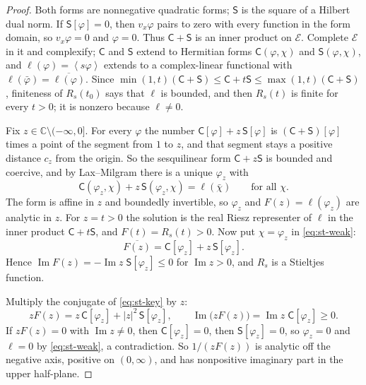 \documentclass[11pt]{article}
\newcommand{\av}[1]{\left\langle #1\right\rangle}
\newcommand{\Imag}{\operatorname{Im}}
\theoremstyle{definition}
\theoremstyle{remark}
\numberwithin{equation}{section}
\begin{document}
\begin{proof}
Both forms are nonnegative quadratic forms; $\mathsf S$ is the square of a
Hilbert dual norm. If $\mathsf S[\varphi]=0$, then $v_x\varphi$ pairs to
zero with every function in the form domain, so $v_x\varphi=0$ and
$\varphi=0$. Thus $\mathsf C+\mathsf S$ is an inner product on $\mathcal E$.
Complete $\mathcal E$ in it and complexify; $\mathsf C$ and $\mathsf S$
extend to Hermitian forms $\mathsf C(\varphi,\chi)$ and
$\mathsf S(\varphi,\chi)$, and $\ell(\varphi)=\av{s\varphi}$ extends to a
complex-linear functional with $\ell(\bar\varphi)=\overline{\ell(\varphi)}$.
Since $\min(1,t)(\mathsf C+\mathsf S)\leq\mathsf C+t\mathsf S
\leq\max(1,t)(\mathsf C+\mathsf S)$, finiteness of $R_s(t_0)$ says that
$\ell$ is bounded, and then $R_s(t)$ is finite for every $t>0$; it is
nonzero because $\ell\ne0$.

Fix $z\in\mathbb C\setminus(-\infty,0]$. For every $\varphi$ the number
$\mathsf C[\varphi]+z\,\mathsf S[\varphi]$ is
$(\mathsf C+\mathsf S)[\varphi]$ times a point of the segment from $1$ to
$z$, and that segment stays a positive distance $c_z$ from the origin. So
the sesquilinear form $\mathsf C+z\mathsf S$ is bounded and coercive, and
by Lax--Milgram there is a unique $\varphi_z$ with
\begin{equation}
 \mathsf C(\varphi_z,\chi)+z\,\mathsf S(\varphi_z,\chi)=\ell(\bar\chi)
 \qquad\text{for all }\chi .
 \label{eq:st-weak}
\end{equation}
The form is affine in $z$ and boundedly invertible, so $\varphi_z$ and
$F(z)=\ell(\varphi_z)$ are analytic in $z$. For $z=t>0$ the solution is
the real Riesz representer of $\ell$ in the inner product
$\mathsf C+t\mathsf S$, and $F(t)=R_s(t)>0$. Now put $\chi=\varphi_z$ in
\eqref{eq:st-weak}:
\begin{equation}
 \overline{F(z)}=\mathsf C[\varphi_z]+z\,\mathsf S[\varphi_z] .
 \label{eq:st-key}
\end{equation}
Hence $\Imag F(z)=-\Imag z\;\mathsf S[\varphi_z]\leq0$ for $\Imag z>0$, and
$R_s$ is a Stieltjes function.

Multiply the conjugate of \eqref{eq:st-key} by $z$:
\[
 zF(z)=z\,\mathsf C[\varphi_z]+|z|^2\,\mathsf S[\varphi_z],
 \qquad \Imag\bigl(zF(z)\bigr)=\Imag z\;\mathsf C[\varphi_z]\geq0 .
\]
If $zF(z)=0$ with $\Imag z\ne0$, then $\mathsf C[\varphi_z]=0$, then
$\mathsf S[\varphi_z]=0$, so $\varphi_z=0$ and $\ell=0$ by
\eqref{eq:st-weak}, a contradiction. So $1/(zF(z))$ is analytic off the
negative axis, positive on $(0,\infty)$, and has nonpositive imaginary
part in the upper half-plane.
\end{proof}
\end{document}
